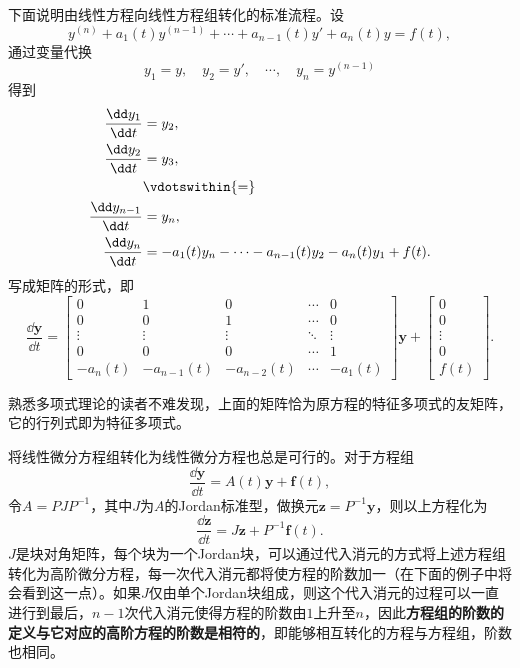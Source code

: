 下面说明由线性方程向线性方程组转化的标准流程。设
\begin{equation}
    y^{(n)}+a_{1}(t)y^{(n-1)}+\cdots +a_{n-1}(t)y'+a_n(t)y=f(t),
\end{equation}
通过变量代换
\begin{equation}
    y_1=y,\quad y_2=y',\quad \cdots,\quad y_n=y^{(n-1)}
\end{equation}
得到
\begin{equation}
    \begin{aligned}
        \frac{\dd y_1}{\dd t}&=y_2,\\
        \frac{\dd y_2}{\dd t}&=y_3,\\
        &\vdotswithin{=}\\
        \frac{\dd y_{n-1}}{\dd t}&=y_n,\\
        \frac{\dd y_n}{\dd t}&=-a_{1}(t)y_{n}-\cdots -a_{n-1}(t)y_2-a_n(t)y_1+f(t).
    \end{aligned}
\end{equation}
写成矩阵的形式，即
\begin{equation}
    \frac{\dd\mathbf{y}}{\dd t}=\begin{bmatrix}
    0 & 1 & 0 & \cdots & 0\\
    0 & 0 & 1 & \cdots & 0\\
    \vdots & \vdots & \vdots & \ddots & \vdots\\
    0 & 0 & 0 & \cdots & 1\\
    -a_n(t) & -a_{n-1}(t) & -a_{n-2}(t) & \cdots & -a_1(t)
    \end{bmatrix}\mathbf{y}+\begin{bmatrix}
    0\\
    0\\
    \vdots\\
    0\\
    f(t)
    \end{bmatrix}.
\end{equation}

熟悉多项式理论的读者不难发现，上面的矩阵恰为原方程的特征多项式的友矩阵，它的行列式即为特征多项式。

将线性微分方程组转化为线性微分方程也总是可行的。对于方程组
\begin{equation}
    \frac{\dd\mathbf{y}}{\dd t}=A(t)\mathbf{y}+\mathbf{f}(t),
\end{equation}
令$A=PJP^{-1}$，其中$J$为$A$的Jordan标准型，做换元$\mathbf{z}=P^{-1}\mathbf{y}$，则以上方程化为
\begin{equation}
    \frac{\dd\mathbf{z}}{\dd t}=J\mathbf{z}+P^{-1}\mathbf{f}(t).
\end{equation}
$J$是块对角矩阵，每个块为一个Jordan块，可以通过代入消元的方式将上述方程组转化为高阶微分方程，每一次代入消元都将使方程的阶数加一（在下面的例子中将会看到这一点）。如果$J$仅由单个Jordan块组成，则这个代入消元的过程可以一直进行到最后，$n-1$次代入消元使得方程的阶数由$1$上升至$n$，因此\textbf{方程组的阶数的定义与它对应的高阶方程的阶数是相符的}，即能够相互转化的方程与方程组，阶数也相同。

